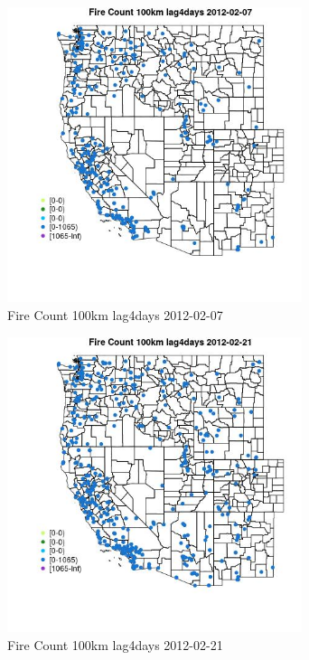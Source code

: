\begin{figure} 
\centering  
\includegraphics[width=0.77\textwidth]{Code_Outputs/Report_ML_input_PM25_Step4_part_f_de_duplicated_aveswNAs_MapObsFire_Count_100km_lag4days2012-02-07.jpg} 
\caption{\label{fig:Report_ML_input_PM25_Step4_part_f_de_duplicated_aveswNAsMapObsFire_Count_100km_lag4days2012-02-07}Fire Count 100km lag4days 2012-02-07} 
\end{figure} 
 

\begin{figure} 
\centering  
\includegraphics[width=0.77\textwidth]{Code_Outputs/Report_ML_input_PM25_Step4_part_f_de_duplicated_aveswNAs_MapObsFire_Count_100km_lag4days2012-02-21.jpg} 
\caption{\label{fig:Report_ML_input_PM25_Step4_part_f_de_duplicated_aveswNAsMapObsFire_Count_100km_lag4days2012-02-21}Fire Count 100km lag4days 2012-02-21} 
\end{figure} 
 

